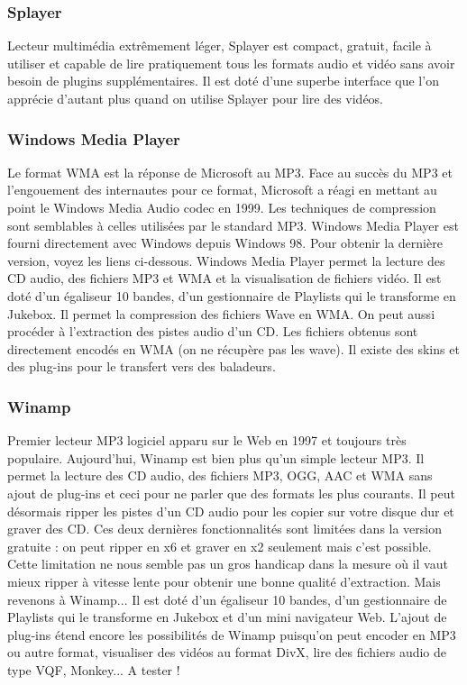 \documentclass[12pt,a4paper]{report}
\begin{document}
\subsubsection{Splayer}

Lecteur multimédia extrêmement léger, Splayer est compact, gratuit, facile à utiliser et capable de lire pratiquement tous les formats audio et vidéo sans avoir besoin de plugins supplémentaires. Il est doté d'une superbe interface que l'on apprécie d'autant plus quand on utilise Splayer pour lire des vidéos. 

\subsubsection{Windows Media Player}

Le format WMA est la réponse de Microsoft au MP3. Face au succès du MP3 et l'engouement des internautes pour ce format, Microsoft a réagi en mettant au point le Windows Media Audio codec en 1999. Les techniques de compression sont semblables à celles utilisées par le standard MP3. Windows Media Player est fourni directement avec Windows depuis Windows 98. Pour obtenir la dernière version, voyez les liens ci-dessous. Windows Media Player permet la lecture des CD audio, des fichiers MP3 et WMA et la visualisation de fichiers vidéo. Il est doté d'un égaliseur 10 bandes, d'un gestionnaire de Playlists qui le transforme en Jukebox. Il permet la compression des fichiers Wave en WMA. On peut aussi procéder à l'extraction des pistes audio d'un CD. Les fichiers obtenus sont directement encodés en WMA (on ne récupère pas les wave). Il existe des skins et des plug-ins pour le transfert vers des baladeurs.

\subsubsection{Winamp}

Premier lecteur MP3 logiciel apparu sur le Web en 1997 et toujours très populaire. Aujourd'hui, Winamp est bien plus qu'un simple lecteur MP3. Il permet la lecture des CD audio, des fichiers MP3, OGG, AAC et WMA sans ajout de plug-ins et ceci pour ne parler que des formats les plus courants. Il peut désormais ripper les pistes d'un CD audio pour les copier sur votre disque dur et graver des CD. Ces deux dernières fonctionnalités sont limitées dans la version gratuite : on peut ripper en x6 et graver en x2 seulement mais c'est possible. Cette limitation ne nous semble pas un gros handicap dans la mesure o\`u il vaut mieux ripper \`a  vitesse lente pour obtenir une bonne qualité d'extraction. Mais revenons \`a  Winamp... Il est doté d'un égaliseur 10 bandes, d'un gestionnaire de Playlists qui le transforme en Jukebox et d'un mini navigateur Web. 
L'ajout de plug-ins étend encore les possibilités de Winamp puisqu'on peut encoder en MP3 ou autre format, visualiser des vidéos au format DivX, lire des fichiers audio de type VQF, Monkey... A tester !
\end{document}
